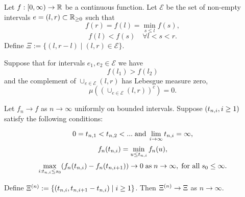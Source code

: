 



\begin{lemma}
Let $f:[0, \infty) \rightarrow \mathbb{R}$ be a continuous function. 
Let $\mathcal{E}$ be the set of non-empty intervals 
$e=(l,r) \subset \mathbb{R}_{\geq 0}$
such that
\begin{equation} \label{E: cond 1}
f(r) = f(l) = \min_{s \leq l} f(s),
\end{equation}
\begin{equation} \label{E: cond 2}
f(l) < f(s) \quad \forall l < s < r.
\end{equation}
Define $\Xi := \lbrace (l, r-l) \; | \; (l, r) \in \mathcal{E} \rbrace$.

Suppose that for intervals $e_1, e_2 \in \mathcal{E}$ we have 
\begin{equation} \label{E: f(l1) > f(l2)}
f(l_1) > f(l_2)
\end{equation}
and the complement of $\cup_{e \in \mathcal{E}} (l,r)$ has Lebesgue measure zero,
\begin{equation} \label{E: complement zero}
\mu \left( \left( \cup_{e \in \mathcal{E}} (l,r) \right)^c\right) = 0.
\end{equation}

Let $f_n \rightarrow f$ as $n \rightarrow \infty$ uniformly on bounded intervals.
Suppose $(t_{n, i}, i \geq 1)$ satisfy the following conditions:

\begin{equation} \label{E: cond 3}
0 = t_{n, 1} < t_{n, 2} < ... \; \text{and} \; \lim_{i \rightarrow \infty} t_{n, i} = \infty,
\end{equation}
\begin{equation} \label{E: cond 4}
f_n(t_{n, i}) = \min_{u \leq t_{n, i}}f_n(u), 
\end{equation}
\begin{equation} \label{E: cond 5}
\max_{i: t_{n, i} \leq s_0}(f_n(t_{n, i}) - f_n(t_{n, i+1})) \rightarrow 0 \; \text{as} \; n \rightarrow \infty, \; \text{for all} \; s_0 \leq \infty.
\end{equation}

Define $\Xi^{(n)} := \lbrace (t_{n, i}, t_{n, i+1} - t_{n, i}) \; | \; i \geq 1 \rbrace$.
Then $\Xi^{(n)} \rightarrow \Xi$ as $n \rightarrow \infty$.
\end{lemma}


